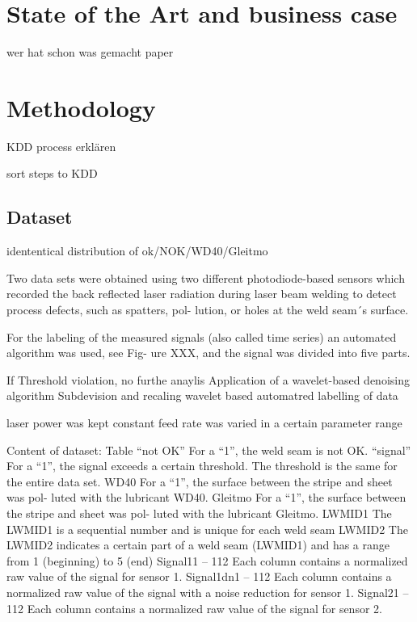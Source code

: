 \documentclass[12pt]{report}
\begin{document}
\chapter{State of the Art and business case}
wer hat schon was gemacht paper 
\chapter{Methodology}
KDD process erklären

sort steps to KDD






\section{Dataset}

idententical distribution of ok/NOK/WD40/Gleitmo

Two data sets were obtained using two different
photodiode-based sensors which recorded the back reflected laser radiation
during laser beam welding to detect process defects, such as spatters, pol-
lution, or holes at the weld seam´s surface.

For the labeling of the measured signals (also called time series) an automated algorithm was used, see Fig-
ure XXX, and the signal was divided into five parts.

If Threshold violation, no furthe anaylis
Application of a wavelet-based denoising algorithm Subdevision and recaling 
wavelet based automatred labelling of data  

laser power was kept constant 
feed rate was varied in a certain parameter range

Content of dataset:
Table 
“not OK”
For a “1”, the weld seam is not OK.
“signal”
For a “1”, the signal exceeds a certain threshold. The threshold
is the same for the entire data set.
WD40
For a “1”, the surface between the stripe and sheet was pol-
luted with the lubricant WD40.
Gleitmo
For a “1”, the surface between the stripe and sheet was pol-
luted with the lubricant Gleitmo.
LWMID1
The LWMID1 is a sequential number and is unique for each
weld seam
LWMID2
The LWMID2 indicates a certain part of a weld seam
(LWMID1) and has a range from 1 (beginning) to 5 (end)
Signal11 – 112
Each column contains a normalized raw value of the signal for
sensor 1.
Signal1dn1 – 112
Each column contains a normalized raw value of the signal
with a noise reduction for sensor 1.
Signal21 – 112
Each column contains a normalized raw value of the signal for
sensor 2.
\end{document}
